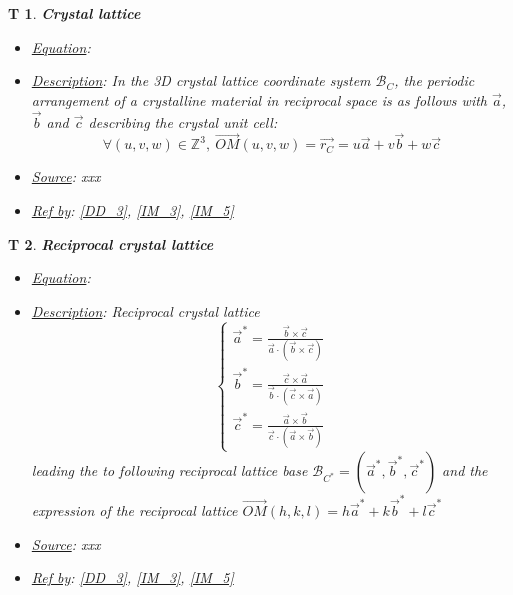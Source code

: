 \documentclass[12pt]{article}
\newtheorem{T}{T}
\begin{document}
\begin{T}
\label{T_2}
\noindent\colorbox{shadecolorT}{\normalfont \textbf{Crystal lattice}}
\normalfont
\begin{itemize}
\item \underline{Equation}: 
\item \underline{Description}: In the 3D crystal lattice coordinate system $\mathcal{B}_C$, the periodic arrangement of a crystalline material in reciprocal space is as follows with $\vec{a}$, $\vec{b}$ and $\vec{c}$ describing the crystal unit cell:
\begin{equation}
\forall (u,v,w) \in \mathbb{Z}^{3}, \ \overrightarrow{OM}(u,v,w) = \vec{r_C} = u \vec{a} + v \vec{b} + w \vec{c} 
\end{equation}
\item \underline{Source}: xxx
\item \underline{Ref by}: \cref{DD_3}, \cref{IM_3}, \cref{IM_5}
\end{itemize}
\end{T}

\begin{T}
\label{T_3}
\noindent\colorbox{shadecolorT}{\normalfont \textbf{Reciprocal crystal lattice}}
\normalfont
\begin{itemize}
\item \underline{Equation}: 
\item \underline{Description}: Reciprocal crystal lattice
\begin{equation}
\begin{cases}
\vec{a}^{*} = \frac{\vec{b}\times \vec{c}}{\vec{a}\cdot(\vec{b}\times \vec{c})} \\
\vec{b}^{*} = \frac{\vec{c}\times \vec{a}}{\vec{b}\cdot(\vec{c}\times \vec{a})} \\
\vec{c}^{*} = \frac{\vec{a}\times \vec{b}}{\vec{c}\cdot(\vec{a}\times \vec{b})}
\end{cases}
\end{equation}
leading the to following reciprocal lattice base $\mathcal{B}_{C^{*}}=(\vec{a}^{*}, \vec{b}^{*}, \vec{c}^{*})$ and the expression of the reciprocal lattice $\vec{OM}(h,k,l) = h\vec{a}^{*} + k\vec{b}^{*} + l\vec{c}^{*}$
\item \underline{Source}: xxx
\item \underline{Ref by}: \cref{DD_3}, \cref{IM_3}, \cref{IM_5}
\end{itemize}
\end{T}
\end{document}
